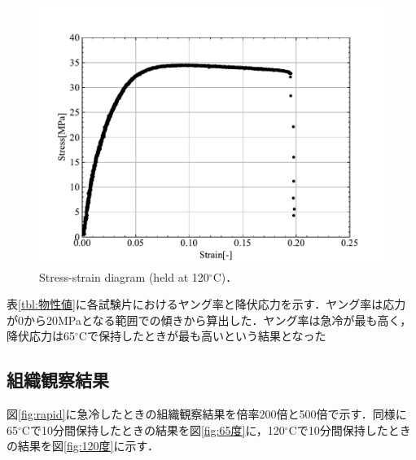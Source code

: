 \begin{figure}[htbp]
  \centering %
  \includegraphics[width=100truemm,clip]{fig/fig_SS-120.pdf}
  \caption{Stress-strain diagram (held at 120$^\circ$C)．}
  \label{fig:SS-120}
\end{figure}

表\ref{tbl:物性値}に各試験片におけるヤング率と降伏応力を示す．ヤング率は応力が0から20MPaとなる範囲での傾きから算出した．ヤング率は急冷が最も高く，降伏応力は65$^\circ$Cで保持したときが最も高いという結果となった
\begin{table}[htbp]
  \centering
    \caption{Mechanical properties of each specimen.}
    \label{tbl:物性値}
\end{table}

\subsection{組織観察結果}
図\ref{fig:rapid}に急冷したときの組織観察結果を倍率200倍と500倍で示す．同様に65$^\circ$Cで10分間保持したときの結果を図\ref{fig:65度}に，120$^\circ$Cで10分間保持したときの結果を図\ref{fig:120度}に示す．

